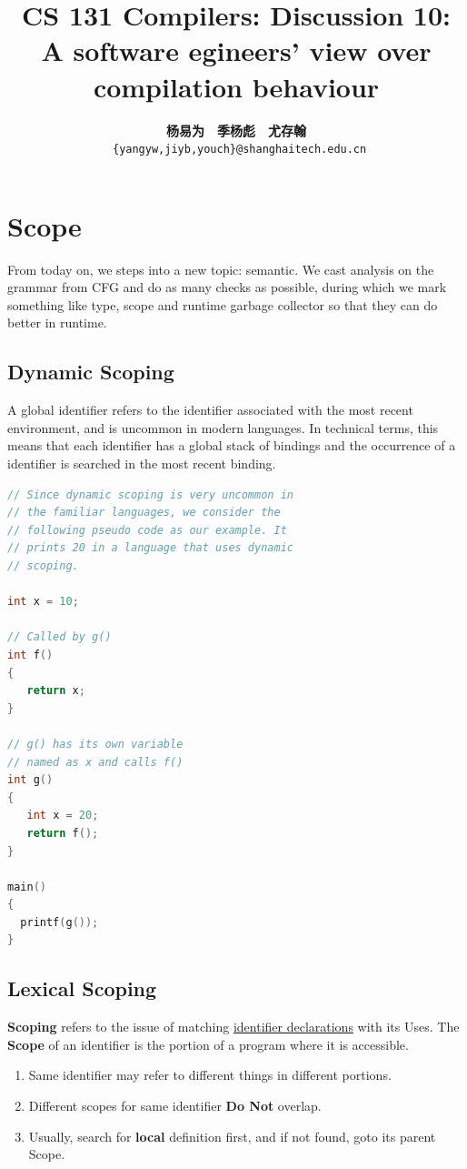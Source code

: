 \documentclass[a4paper]{article}
\title{CS 131 Compilers: Discussion 10: A software egineers' view over compilation behaviour}
\author{\textbf{杨易为}~~\textbf{季杨彪}~~\textbf{尤存翰} \\ \texttt{ \{yangyw,jiyb,youch\}@shanghaitech.edu.cn}}
\theoremstyle{definition}
\begin{document}
\maketitle
\section{Scope}
From today on, we steps into a new topic: semantic. We cast analysis on the grammar from CFG and do as many checks as possible, during which we mark something like type, scope and runtime garbage collector so that they can do better in runtime.
\subsection{Dynamic Scoping}
A global identifier refers to the identifier associated with the most recent environment, and is uncommon in modern languages. In technical terms, this means that each identifier has a global stack of bindings and the occurrence of a identifier is searched in the most recent binding.

\begin{lstlisting}[language=C]
// Since dynamic scoping is very uncommon in 
// the familiar languages, we consider the 
// following pseudo code as our example. It
// prints 20 in a language that uses dynamic
// scoping.   
  
int x = 10;
  
// Called by g()
int f()
{
   return x;
}
  
// g() has its own variable
// named as x and calls f()
int g()
{
   int x = 20;
   return f();
}
  
main()
{
  printf(g());
}
\end{lstlisting}
\subsection{Lexical Scoping}

\textbf{Scoping} refers to the issue of matching \href{https://docs.python.org/zh-cn/3.9/reference/compound_stmts.html#class-definitions}{identifier declarations} with its Uses. The \textbf{Scope} of an identifier is the portion of a program where it is accessible.
\begin{enumerate}
  \item Same identifier may refer to different things in different portions.
  \item Different scopes for same identifier \textbf{Do Not} overlap.
  \item Usually, search for \textbf{local} definition first, and if not found, goto its parent Scope.
\end{enumerate} 
\end{document}
